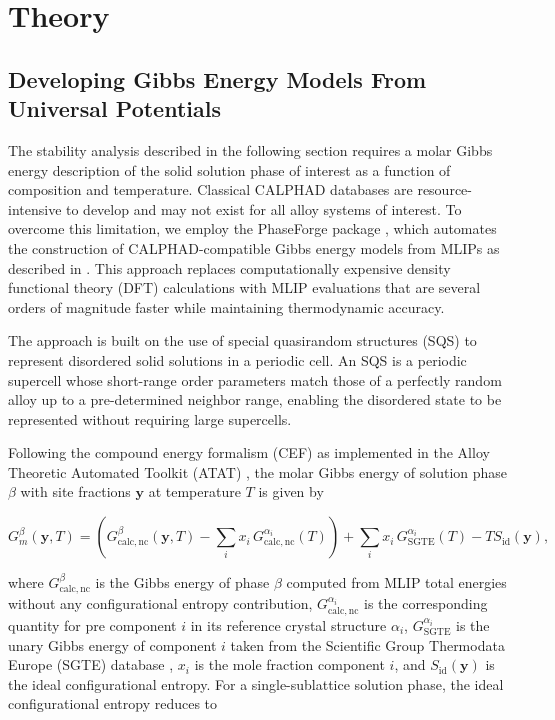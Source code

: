 \section{Theory}
\label{sec:theory}
\subsection{Developing Gibbs Energy Models From Universal Potentials}
\label{sec:gibbs_models}

The stability analysis described in the following section requires a molar Gibbs energy description of the solid solution phase of interest as a function of composition and temperature. Classical CALPHAD databases are resource-intensive to develop and may not exist for all alloy systems of interest. To overcome this limitation, we employ the PhaseForge package \cite{sariturk_2025_15730911}, which automates the construction of CALPHAD-compatible Gibbs energy models from MLIPs as described in \cite{zhu2025accelerating,zhu2025machine}. This approach replaces computationally expensive density functional theory (DFT) calculations with MLIP evaluations that are several orders of magnitude faster while maintaining thermodynamic accuracy.

The approach is built on the use of special quasirandom structures (SQS) \cite{zunger1990special} to represent disordered solid solutions in a periodic cell. An SQS is a periodic supercell whose short-range order parameters match those of a perfectly random alloy up to a pre-determined neighbor range, enabling the disordered state to be represented without requiring large supercells.

Following the compound energy formalism (CEF) as implemented in the Alloy Theoretic Automated Toolkit (ATAT) \cite{van2002alloy}, the molar Gibbs energy of solution phase $\beta$ with site fractions $\boldsymbol{y}$ at temperature $T$ is given by

\begin{equation}\label{eq:gibbs_cef}
    G^\beta_m(\boldsymbol{y}, T) = \left(G^\beta_{\mathrm{calc,nc}}(\boldsymbol{y}, T) - \sum_i x_i\, G^{\alpha_i}_{\mathrm{calc,nc}}(T)\right) + \sum_i x_i\, G^{\alpha_i}_{\mathrm{SGTE}}(T) - T S_{\mathrm{id}}(\boldsymbol{y}),
\end{equation}

where $G^\beta_{\mathrm{calc,nc}}$ is the Gibbs energy of phase $\beta$ computed from MLIP total energies without any configurational entropy contribution, $G^{\alpha_i}_{\mathrm{calc,nc}}$ is the corresponding quantity for pre component $i$ in its reference crystal structure $\alpha_i$, $G^{\alpha_i}_{\mathrm{SGTE}}$ is the unary Gibbs energy of component $i$ taken from the Scientific Group Thermodata Europe (SGTE) database \cite{dinsdale1991sgte}, $x_i$ is the mole fraction component $i$, and $S_{\mathrm{id}}(\boldsymbol{y})$ is the ideal configurational entropy. For a single-sublattice solution phase, the ideal configurational entropy reduces to

